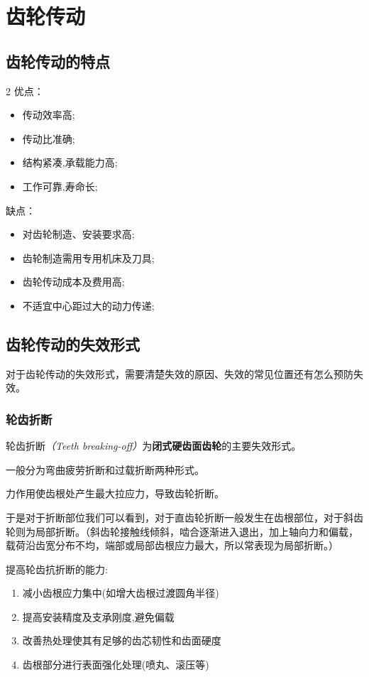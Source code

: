 \chapter{齿轮传动}
\section{齿轮传动的特点}
\begin{paracol}{2}
优点：
\begin{itemize}
\item 传动效率高;
\item 传动比准确;
\item 结构紧凑,承载能力高;
\item 工作可靠,寿命长;
\end{itemize}
\switchcolumn
缺点：
\begin{itemize}
    \item 对齿轮制造、安装要求高;
    \item 齿轮制造需用专用机床及刀具;
    \item 齿轮传动成本及费用高;
    \item 不适宜中心距过大的动力传递;
\end{itemize}

\end{paracol}

\section{齿轮传动的失效形式}
对于齿轮传动的失效形式，需要清楚失效的原因、失效的常见位置还有怎么预防失效。
\subsection{轮齿折断}
轮齿折断\textit{（Teeth breaking-off）}为\textbf{闭式硬齿面齿轮}的主要失效形式。

一般分为弯曲疲劳折断和过载折断两种形式。

力作用使齿根处产生最大拉应力，导致齿轮折断。

于是对于折断部位我们可以看到，对于直齿轮折断一般发生在齿根部位，对于斜齿轮则为局部折断。（斜齿轮接触线倾斜，啮合逐渐进入退出，加上轴向力和偏载，载荷沿齿宽分布不均，端部或局部齿根应力最大，所以常表现为局部折断。）

提高轮齿抗折断的能力:
\begin{enumerate}
    \item 减小齿根应力集中(如增大齿根过渡圆角半径)
    \item 提高安装精度及支承刚度,避免偏载
    \item 改善热处理使其有足够的齿芯韧性和齿面硬度
    \item 齿根部分进行表面强化处理(喷丸、滚压等)
\end{enumerate}

